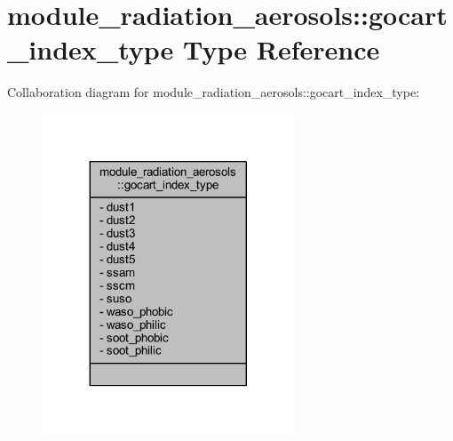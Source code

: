 \hypertarget{structmodule__radiation__aerosols_1_1gocart__index__type}{}\section{module\+\_\+radiation\+\_\+aerosols\+:\+:gocart\+\_\+index\+\_\+type Type Reference}
\label{structmodule__radiation__aerosols_1_1gocart__index__type}


Collaboration diagram for module\+\_\+radiation\+\_\+aerosols\+:\+:gocart\+\_\+index\+\_\+type\+:\nopagebreak
\begin{figure}[H]
\begin{center}
\leavevmode
\includegraphics[width=212pt]{structmodule__radiation__aerosols_1_1gocart__index__type__coll__graph}
\end{center}
\end{figure}

